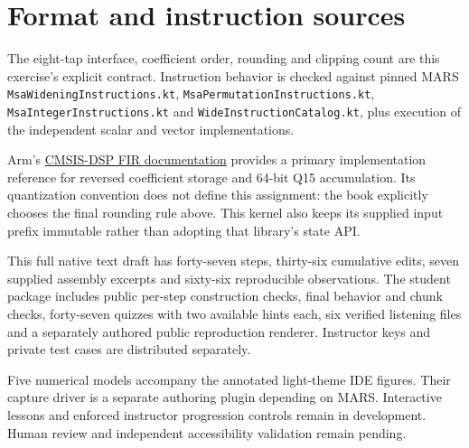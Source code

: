 \section*{Format and instruction sources}
The eight-tap interface, coefficient order, rounding and clipping count are this
exercise's explicit contract. Instruction behavior is checked against pinned MARS
\texttt{MsaWideningInstructions.kt}, \texttt{MsaPermutationInstructions.kt},
\texttt{MsaIntegerInstructions.kt} and \texttt{WideInstructionCatalog.kt}, plus
execution of the independent scalar and vector implementations.

Arm's \href{https://arm-software.github.io/CMSIS-DSP/v1.10.1/group__FIR.html}{CMSIS-DSP FIR documentation}
provides a primary implementation reference for reversed coefficient storage and
64-bit Q15 accumulation. Its quantization convention does not define this assignment:
the book explicitly chooses the final rounding rule above. This kernel also keeps
its supplied input prefix immutable rather than adopting that library's state API.

This full native text draft has forty-seven steps, thirty-six cumulative edits,
seven supplied assembly excerpts and sixty-six reproducible observations. The student
package includes public per-step construction checks, final behavior and chunk checks,
forty-seven quizzes with two available hints each, six verified listening files and a
separately authored public reproduction renderer. Instructor keys and private test
cases are distributed separately.

Five numerical models accompany the annotated light-theme IDE figures. Their capture
driver is a separate authoring plugin depending on MARS. Interactive lessons and enforced
instructor progression controls remain in development. Human review and independent
accessibility validation remain pending.
